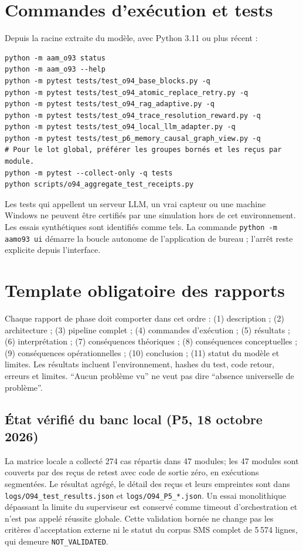 \documentclass[11pt,a4paper]{article}
\begin{document}
\section{Commandes d'exécution et tests}
Depuis la racine extraite du modèle, avec Python 3.11 ou plus récent :
\begin{verbatim}
python -m aam_o93 status
python -m aam_o93 --help
python -m pytest tests/test_o94_base_blocks.py -q
python -m pytest tests/test_o94_atomic_replace_retry.py -q
python -m pytest tests/test_o94_rag_adaptive.py -q
python -m pytest tests/test_o94_trace_resolution_reward.py -q
python -m pytest tests/test_o94_local_llm_adapter.py -q
python -m pytest tests/test_p6_memory_causal_graph_view.py -q
# Pour le lot global, préférer les groupes bornés et les reçus par module.
python -m pytest --collect-only -q tests
python scripts/o94_aggregate_test_receipts.py
\end{verbatim}
Les tests qui appellent un serveur LLM, un vrai capteur ou une machine Windows ne peuvent être certifiés par une simulation hors de cet environnement. Les essais synthétiques sont identifiés comme tels. La commande \texttt{python -m aam\textunderscore o93 ui} démarre la boucle autonome de l'application de bureau ; l'arrêt reste explicite depuis l'interface.

\section{Template obligatoire des rapports}
Chaque rapport de phase doit comporter dans cet ordre : (1) description ; (2) architecture ; (3) pipeline complet ; (4) commandes d'exécution ; (5) résultats ; (6) interprétation ; (7) conséquences théoriques ; (8) conséquences conceptuelles ; (9) conséquences opérationnelles ; (10) conclusion ; (11) statut du modèle et limites. Les résultats incluent l'environnement, hashes du test, code retour, erreurs et limites. ``Aucun problème vu'' ne veut pas dire ``absence universelle de problème''.


\subsection{État vérifié du banc local (P5, 18 octobre 2026)}
La matrice locale a collecté 274 cas répartis dans 47 modules; les 47 modules sont couverts par des reçus de retest avec code de sortie zéro, en exécutions segmentées. Le résultat agrégé, le détail des reçus et leurs empreintes sont dans \texttt{logs/O94\_test\_results.json} et \texttt{logs/O94\_P5\_*.json}. Un essai monolithique dépassant la limite du superviseur est conservé comme timeout d'orchestration et n'est pas appelé réussite globale. Cette validation bornée ne change pas les critères d'acceptation externe ni le statut du corpus SMS complet de 5\,574 lignes, qui demeure \texttt{NOT\_VALIDATED}.
\end{document}
